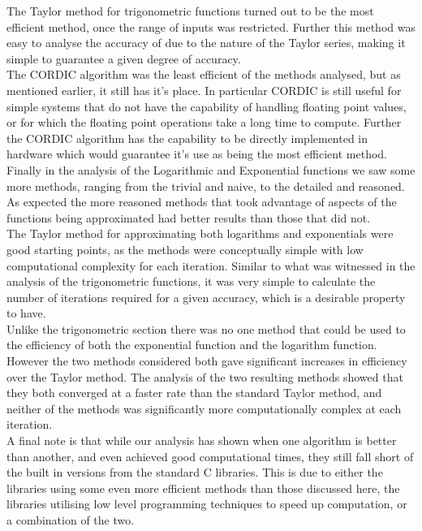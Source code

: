 The Taylor method for trigonometric functions turned out to be the most efficient method, once the range of inputs was restricted. Further this method was easy to analyse the accuracy of due to the nature of the Taylor series, making it simple to guarantee a given degree of accuracy.\\

The CORDIC algorithm was the least efficient of the methods analysed, but as mentioned earlier, it still has it's place. In particular CORDIC is still useful for simple systems that do not have the capability of handling floating point values, or for which the floating point operations take a long time to compute. Further the CORDIC algorithm has the capability to be directly implemented in hardware which would guarantee it's use as being the most efficient method.\\

Finally in the analysis of the Logarithmic and Exponential functions we saw some more methods, ranging from the trivial and naive, to the detailed and reasoned. As expected the more reasoned methods that took advantage of aspects of the functions being approximated had better results than those that did not.\\

The Taylor method for approximating both logarithms and exponentials were good starting points, as the methods were conceptually simple with low computational complexity for each iteration. Similar to what was witnessed in the analysis of the trigonometric functions, it was very simple to calculate the number of iterations required for a given accuracy, which is a desirable property to have.\\

Unlike the trigonometric section there was no one method that could be used to the efficiency of both the exponential function and the logarithm function. However the two methods considered both gave significant increases in efficiency over the Taylor method. The analysis of the two resulting methods showed that they both converged at a faster rate than the standard Taylor method, and neither of the methods was significantly more computationally complex at each iteration.\\

A final note is that while our analysis has shown when one algorithm is better than another, and even achieved good computational times, they still fall short of the built in versions from the standard C libraries. This is due to either the libraries using some even more efficient methods than those discussed here, the libraries utilising low level programming techniques to speed up computation, or a combination of the two.
